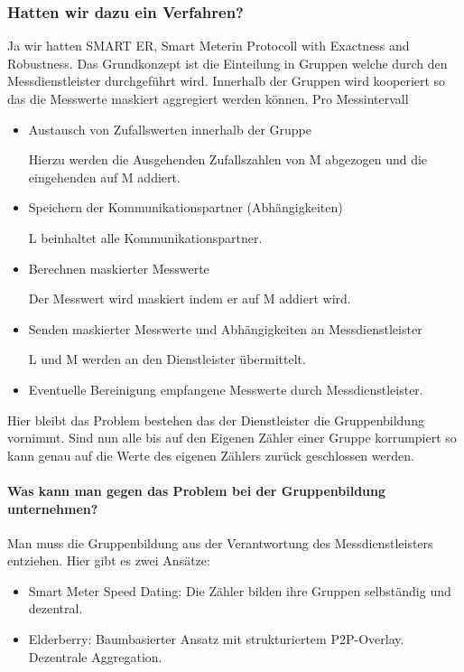 \subsubsection{Hatten wir dazu ein Verfahren?}
Ja wir hatten SMART\- ER, Smart Meterin Protocoll with Exactness and Robustness.
Das Grundkonzept ist die Einteilung in Gruppen welche durch den Messdienstleister durchgeführt wird. 
Innerhalb der Gruppen wird kooperiert so das die Messwerte maskiert aggregiert werden können.
Pro Messintervall
\begin{itemize}
	\item Austausch von Zufallswerten innerhalb der Gruppe 
	
	Hierzu werden die Ausgehenden Zufallszahlen von M abgezogen und die eingehenden auf M addiert. 
	\item Speichern der Kommunikationspartner (Abhängigkeiten)
	
	
	L beinhaltet alle Kommunikationspartner.
	\item Berechnen maskierter Messwerte
	
	Der Messwert wird maskiert indem er auf M addiert wird.
	\item Senden maskierter Messwerte und Abhängigkeiten an Messdienstleister
	
	L und M werden an den Dienstleister übermittelt.
	\item Eventuelle Bereinigung empfangene Messwerte durch Messdienstleister.
\end{itemize}

Hier bleibt das Problem bestehen das der Dienstleister die Gruppenbildung vornimmt. Sind nun alle bis auf den Eigenen Zähler einer Gruppe korrumpiert so kann genau auf die Werte des eigenen Zählers zurück geschlossen werden.

	\paragraph{Was kann man gegen das Problem bei der Gruppenbildung unternehmen?}
	Man muss die Gruppenbildung aus der Verantwortung des Messdienstleisters entziehen. Hier gibt es zwei Ansätze:	
	\begin{itemize}
		\item Smart Meter Speed Dating: Die Zähler bilden ihre Gruppen selbständig und dezentral. 
		\item Elderberry: Baumbasierter Ansatz mit strukturiertem P2P-Overlay. Dezentrale Aggregation.
	\end{itemize}
	
